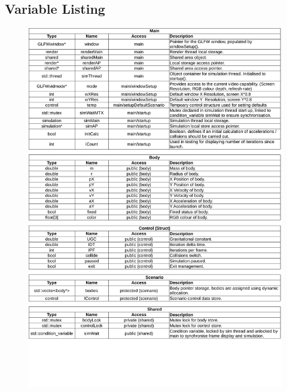 \subsection{Variable Listing}

\begin{figure}[H]
   \centering
   \includegraphics[page=1, width=\textwidth]{../varlist.pdf} 
\end{figure}

